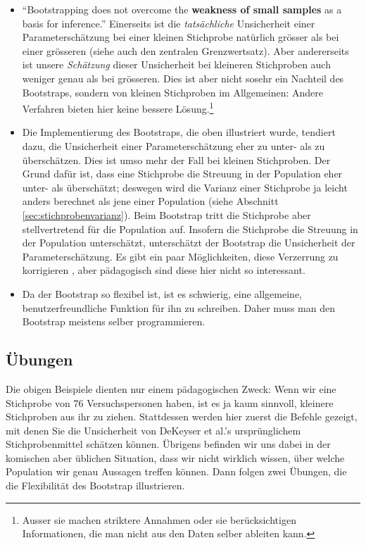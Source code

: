 \documentclass[oneside, 10pt]{book}\usepackage[]{graphicx}\usepackage[]{xcolor}
\begin{document}
\begin{itemize}
 \item ``Bootstrapping does not overcome the \textbf{weakness of small samples} as a basis for inference.'' \citep[][S.~379]{Hesterberg2015}
 Einerseits ist die \emph{tatsächliche} Unsicherheit einer Parameterschätzung
 bei einer kleinen Stichprobe natürlich grösser als bei einer grösseren (siehe auch
 den zentralen Grenzwertsatz). Aber andererseits ist unsere \emph{Schätzung} dieser
 Unsicherheit bei kleineren Stichproben auch weniger genau als bei grösseren.
 Dies ist aber nicht sosehr ein Nachteil des Bootstraps, sondern von kleinen
 Stichproben im Allgemeinen: Andere Verfahren bieten hier keine bessere Lösung.\footnote{Ausser sie machen striktere Annahmen oder sie berücksichtigen Informationen, die man nicht aus den Daten selber ableiten kann.}

 \item Die Implementierung des Bootstraps, die oben illustriert wurde, tendiert dazu,
 die Unsicherheit einer Parameterschätzung eher zu unter- als zu überschätzen.
 Dies ist umso mehr der Fall bei kleinen Stichproben.
 Der Grund dafür ist, dass eine Stichprobe die Streuung in der Population eher
 unter- als überschätzt; deswegen wird die Varianz einer Stichprobe ja leicht
 anders berechnet als jene einer Population (siehe Abschnitt \vref{sec:stichprobenvarianz}).
 Beim Bootstrap tritt die Stichprobe aber stellvertretend für die Population auf.
 Insofern die Stichprobe die Streuung in der Population unterschätzt, unterschätzt
 der Bootstrap die Unsicherheit der Parameterschätzung.
 Es gibt ein paar Möglichkeiten, diese Verzerrung zu korrigieren
 \citep[siehe][]{Efron1993}, aber pädagogisch
 sind diese hier nicht so interessant.

 \item Da der Bootstrap so flexibel ist, ist es schwierig, eine allgemeine,
 benutzerfreundliche Funktion für ihn zu schreiben.
 Daher muss man den Bootstrap meistens selber programmieren.
\end{itemize}

\subsection{Übungen}
Die obigen Beispiele dienten nur einem pädagogischen Zweck:
Wenn wir eine Stichprobe von 76 Versuchspersonen haben,
ist es ja kaum sinnvoll, kleinere Stichproben aus ihr zu ziehen.
Stattdessen werden hier zuerst die Befehle gezeigt,
mit denen Sie die Unsicherheit von DeKeyser et al.'s
ursprünglichem Stichprobenmittel schätzen können.
Übrigens befinden wir uns dabei in der komischen aber üblichen
Situation, dass wir nicht wirklich wissen, über welche
Population wir genau Aussagen treffen können.
Dann folgen zwei Übungen, die die Flexibilität des Bootstrap
illustrieren.
\end{document}
